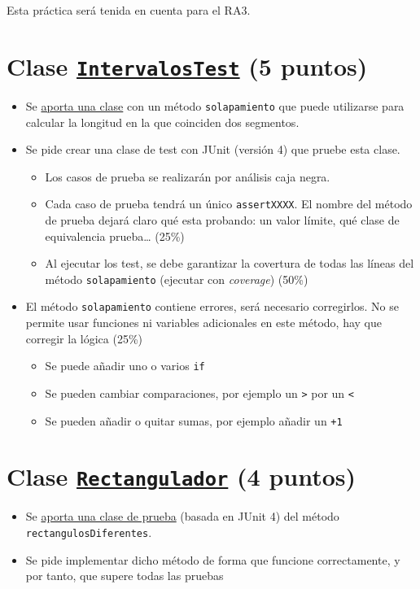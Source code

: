 \documentclass[a4paper]{article}
\begin{document}
Esta práctica será tenida en cuenta para el RA3.
\section{Clase \href{https://codeberg.org/alvarogonzalezsotillo/template-practica-junit/src/branch/master/src/pruebas/IntervalosTest.java}{\texttt{IntervalosTest}} (5 puntos)}
\label{sec:org0000003}
\begin{itemize}
\item Se \href{https://codeberg.org/alvarogonzalezsotillo/template-practica-junit/src/branch/master/src/implementaciones/Intervalos.java}{aporta una clase} con un método \texttt{solapamiento} que puede utilizarse para calcular la longitud en la que coinciden dos segmentos.
\item Se pide crear una clase de test con JUnit (versión 4) que pruebe esta clase.
\begin{itemize}
\item Los casos de prueba se realizarán por análisis caja negra.
\item Cada caso de prueba tendrá un único \texttt{assertXXXX}. El nombre del método de prueba dejará claro qué esta probando: un valor límite, qué clase de equivalencia prueba\ldots{} (25\%)
\item Al ejecutar los test, se debe garantizar la covertura de todas las líneas del método \texttt{solapamiento} (ejecutar con \emph{coverage}) (50\%)
\end{itemize}
\item El método \texttt{solapamiento} contiene errores, será necesario corregirlos. No se permite usar funciones ni variables adicionales en este método, hay que corregir la lógica (25\%)
\begin{itemize}
\item Se puede añadir uno o varios \texttt{if}
\item Se pueden cambiar comparaciones, por ejemplo un \texttt{>} por un \texttt{<}
\item Se pueden añadir o quitar sumas, por ejemplo añadir un \texttt{+1}
\end{itemize}
\end{itemize}
\section{Clase \href{https://codeberg.org/alvarogonzalezsotillo/template-practica-junit/src/branch/master/src/implementaciones/Rectangulador.java}{\texttt{Rectangulador}} (4 puntos)}
\label{sec:org0000006}
\begin{itemize}
\item Se \href{https://codeberg.org/alvarogonzalezsotillo/template-practica-junit/src/branch/master/src/pruebas/RectanguladorTest.java}{aporta una clase de prueba} (basada en JUnit 4) del método \texttt{rectangulosDiferentes}.
\item Se pide implementar dicho método de forma que funcione correctamente, y por tanto, que supere todas las pruebas
\end{itemize}
\end{document}
